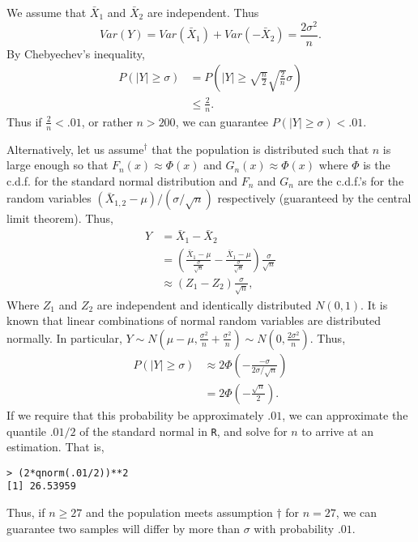 \documentclass{homework}
\begin{document}
\begin{solution}
  We assume that $\bar X_1$ and $\bar X_2$ are independent.  Thus 
  $$Var(Y) = Var(\bar X_1) + Var(-\bar X_2) = \frac{2\sigma^2}{n}.$$
  By Chebyechev's inequality,
  \begin{align*}
  P(|Y| \ge \sigma ) 
  &= P\left( |Y| \ge \sqrt{\frac n2} \sqrt{\frac 2n}\sigma\right) \\
  &\le \frac 2n. 
  \end{align*}
  Thus if $\frac 2n < .01 $, or rather $n > 200$, we can guarantee $P(|Y| \ge \sigma) < .01$.

  Alternatively, let us assume$^\dagger$ that the population is distributed such that $n$ is large enough so that $F_{n}(x) \approx \Phi(x)$ and $G_n(x) \approx \Phi(x)$ where $\Phi$ is the c.d.f. for the standard normal distribution and $F_{n}$ and $G_{n}$ are the c.d.f.'s for the random variables $(\bar X_{1,2} -\mu)/(\sigma/\sqrt {n})$ respectively (guaranteed by the central limit theorem). Thus,
  \begin{align*}
    Y &= \bar X_1 - \bar X_2 \\
      &= \left( \frac{\bar X_1 - \mu}{\frac{\sigma}{\sqrt n}} - \frac{\bar X_1 - \mu}{\frac{\sigma}{\sqrt n}}\right) \frac{\sigma}{\sqrt n} \\
      &\approx (Z_1 - Z_2)\frac{\sigma}{\sqrt n},
  \end{align*}
  Where $Z_1$ and $Z_2$ are independent and identically distributed $N(0,1)$.  It is known that linear combinations of normal random variables are distributed normally.  In particular, $Y \sim N\left( \mu - \mu , \frac{\sigma^2}{n} + \frac{\sigma^2}{n}\right)\sim N\left(0,\frac{2\sigma^2}{n}\right)$. Thus,
  \begin{align*}
    P(|Y| \ge \sigma) 
    &\approx 2 \Phi\left( - \frac{-\sigma}{2\sigma/\sqrt n} \right) \\
    &= 2\Phi \left( - \frac{\sqrt n}2\right).
  \end{align*}
  If we require that this probability be approximately $.01$, we can approximate the quantile $.01/2$ of the standard normal in \texttt{R}, and solve for $n$ to arrive at an estimation.  That is,
\begin{verbatim}
> (2*qnorm(.01/2))**2 
[1] 26.53959
\end{verbatim}
Thus, if $n \ge 27$ and the population meets assumption $\dagger$ for $n=27$, we can guarantee two samples will differ by more than $\sigma$ with probability $.01$.
\end{solution}
\end{document}
